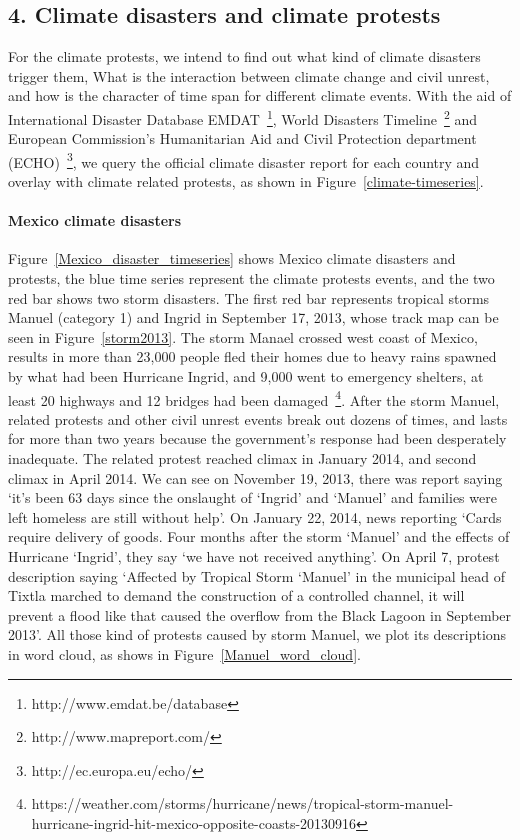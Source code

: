 \documentclass[9pt,twocolumn,twoside]{pnas-new}
\begin{document}
\subsection{4. Climate disasters and climate protests}
For the climate protests, we intend to find out what kind of climate disasters trigger them, What is the interaction between climate change and civil unrest, and how is the character of time span for different climate events. With the aid of International Disaster Database EMDAT~\footnote{http://www.emdat.be/database}, World Disasters Timeline~\footnote{http://www.mapreport.com/} and European Commission's Humanitarian Aid and Civil Protection department (ECHO)~\footnote{http://ec.europa.eu/echo/}, we query the official climate disaster report for each country and overlay with climate related protests, as shown in Figure~\ref{climate-timeseries}.


\paragraph{Mexico climate disasters}
Figure~\ref{Mexico_disaster_timeseries} shows Mexico climate disasters and protests, the blue time series represent the climate protests events, and the two red bar shows two storm disasters. The first red bar represents tropical storms Manuel (category 1) and Ingrid in September 17, 2013, whose track map can be seen in Figure~\ref{storm2013}. The storm Manael crossed west coast of Mexico, results in more than 23,000 people fled their homes due to heavy rains spawned by what had been Hurricane Ingrid, and 9,000 went to emergency shelters, at least 20 highways and 12 bridges had been damaged~\footnote{https://weather.com/storms/hurricane/news/tropical-storm-manuel-hurricane-ingrid-hit-mexico-opposite-coasts-20130916}.
After the storm Manuel, related protests and other civil unrest events break out dozens of times, and lasts for more than two years because the government's response had been desperately inadequate. The related protest reached climax in January 2014, and second climax in April 2014. We can see on November 19, 2013, there was report saying `it's been 63 days since the onslaught of `Ingrid' and `Manuel' and families were left homeless are still without help'. On January 22, 2014, news reporting `Cards require delivery of goods. Four months after the storm `Manuel' and the effects of Hurricane `Ingrid', they say `we have not received anything'. On April 7, protest description saying `Affected by Tropical Storm `Manuel' in the municipal head of Tixtla marched to demand the construction of a controlled channel, it will prevent a flood like that caused the overflow from the Black Lagoon in September 2013'. All those kind of protests caused by storm Manuel, we plot its descriptions in word cloud, as shows in Figure~\ref{Manuel_word_cloud}.
\end{document}

